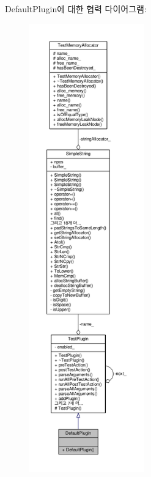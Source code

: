 Default\+Plugin에 대한 협력 다이어그램\+:
\nopagebreak
\begin{figure}[H]
\begin{center}
\leavevmode
\includegraphics[height=550pt]{struct_default_plugin__coll__graph}
\end{center}
\end{figure}

